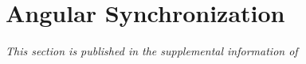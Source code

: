 %
%
%
%
%
%


\section{Angular Synchronization } \label{sec:ang_synch}

{\em This section is published in the supplemental information of \cite{dsilva2015temporal}}


